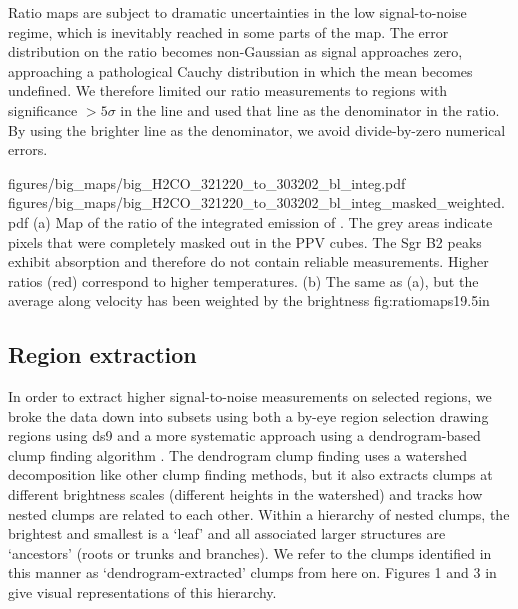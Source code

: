 
Ratio maps are subject to dramatic uncertainties in the low signal-to-noise
regime, which is inevitably reached in some parts of the map.  The error
distribution on the ratio becomes non-Gaussian as signal approaches zero,
approaching a pathological Cauchy distribution in which the mean becomes
undefined.
We therefore limited our ratio measurements to regions with significance
$>5\sigma$ in the \threeohthree line and used that line as the denominator
in the ratio.  By using the brighter line as the denominator, we avoid
divide-by-zero numerical errors.


\RotFigureTwoAA
{figures/big_maps/big_H2CO_321220_to_303202_bl_integ.pdf}
{figures/big_maps/big_H2CO_321220_to_303202_bl_integ_masked_weighted.pdf}
{(a) Map of the ratio of the integrated emission of
\Rone.  The grey areas indicate pixels that were completely masked out in the
PPV cubes.  The Sgr B2 peaks exhibit \formaldehyde absorption and therefore do
not contain reliable measurements.  Higher ratios
(red) correspond
to higher temperatures.
\newline
(b) The same as (a), but the average along velocity has been
weighted by the \threeohthree brightness
\newline
}
{fig:ratiomaps}{1}{9.5in}



\subsection{Region extraction}
\label{sec:region}
In order to extract higher signal-to-noise measurements on selected regions, we
broke the data down into subsets using both a by-eye region selection drawing
regions using ds9 and a more systematic approach using a dendrogram-based clump
finding algorithm \citep[][\url{http://dendrograms.org/}]{Rosolowsky2008c}.
The dendrogram clump finding uses a watershed decomposition like other clump
finding methods, but it also extracts clumps at different brightness scales
(different heights in the watershed) and tracks how nested clumps are related
to each other.  Within a hierarchy of nested clumps, the brightest and smallest
is a `leaf' and all associated larger structures are `ancestors' (roots or
trunks and branches).  We refer to the clumps identified in this manner as
`dendrogram-extracted' clumps from here on.
Figures 1 and 3 in \citet{Rosolowsky2008c} give visual representations of this
hierarchy.

